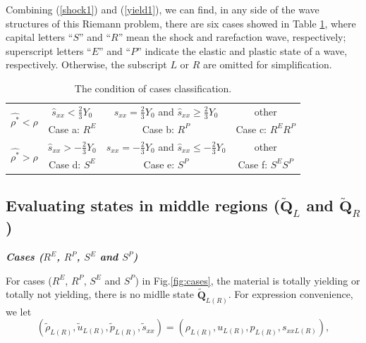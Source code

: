 \documentclass[review]{elsarticle}
\numberwithin{equation}{section}
\numberwithin{table}{section}
\begin{document}
Combining (\ref{shock1}) and (\ref{yield1}), we can find, in any side of the wave structures of this Riemann problem, there are six cases showed in Table \ref{tab:cases}, where capital letters ``$S$'' and ``$R$'' mean the shock and rarefaction wave, respectively; superscript letters ``$E$'' and  ``$P$'' indicate the elastic and plastic state of a wave, respectively. Otherwise, the  subscript $L$ or  $R$  are omitted for simplification.


\begin{table}
  \centering
  \caption{The condition of  cases classification.}
  \begin{tabular}{c|ccc}
	\toprule
	\multirow{2}{*}{  $\hat{\rho^*} <\rho$ }  &  $\hat{s}_{xx}<\frac{2}{3}Y_0$ & $s_{xx}=\frac{2}{3}Y_0$ and  $\hat{s}_{xx} \geq \frac{2}{3}Y_0$ &  other\\
	\cline{2-4}
 & Case a: $R^{E}$ & Case b: $ R^{P}$ & Case c: $R^{E}R^{P}$ \\
 \hline
 \multirow{2}{*}{  $\hat{\rho^*} >\rho$ } & $\hat{s}_{xx} > -\frac{2}{3}Y_0$ & $s_{xx}=-\frac{2}{3}Y_0$  and  $\hat{s}_{xx} \leq -\frac{2}{3}Y_0$&  other\\
	\cline{2-4}
  & Case d: $S^{E}$ & Case e: $ S^{P}$ & Case f: $S^{E}S^{P}$ \\
  \bottomrule
\end{tabular}
\label{tab:cases}
\end{table}

\subsection{Evaluating states in  middle regions ($\tilde{\mathbf{Q}}_{L}$ and   $\tilde{\mathbf{Q}}_{R}$) }


\emph{\textbf{Cases ($R^{E}$, $R^{P}$, $S^{E}$ and $S^{P}$)}}

 For cases ($R^{E}$, $R^{P}$, $S^{E}$ and $S^{P}$) in Fig.\ref{fig:cases}, the material is totally yielding or totally not yielding, there is no midlle state $\tilde{\mathbf{Q}}_{L(R)}$. For  expression convenience, we let
 \begin{equation}
   (\tilde{\rho}_{L(R)},\tilde{u}_{L(R)},\tilde{p}_{L(R)},\tilde{s}_{xx}) =(\rho_{L(R)}, u_{L(R)},p_{L(R)},s_{xxL(R)}),
\end{equation}
\end{document}
